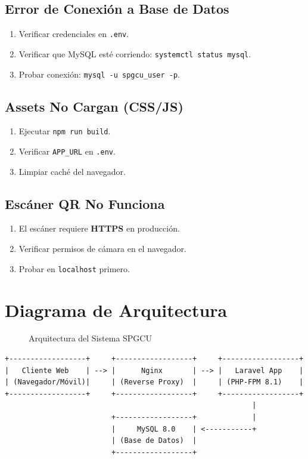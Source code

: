 \documentclass[12pt,a4paper]{article}
\begin{document}
\subsection{Error de Conexión a Base de Datos}
\begin{enumerate}
    \item Verificar credenciales en \texttt{.env}.
    \item Verificar que MySQL esté corriendo: \texttt{systemctl status mysql}.
    \item Probar conexión: \texttt{mysql -u spgcu\_user -p}.
\end{enumerate}

\subsection{Assets No Cargan (CSS/JS)}
\begin{enumerate}
    \item Ejecutar \texttt{npm run build}.
    \item Verificar \texttt{APP\_URL} en \texttt{.env}.
    \item Limpiar caché del navegador.
\end{enumerate}

\subsection{Escáner QR No Funciona}
\begin{enumerate}
    \item El escáner requiere \textbf{HTTPS} en producción.
    \item Verificar permisos de cámara en el navegador.
    \item Probar en \texttt{localhost} primero.
\end{enumerate}

\section{Diagrama de Arquitectura}

\begin{figure}[h]
    \centering
    \caption{Arquitectura del Sistema SPGCU}
    \label{fig:arquitectura}
\end{figure}

\begin{verbatim}
+------------------+     +------------------+     +------------------+
|   Cliente Web    | --> |      Nginx       | --> |   Laravel App    |
| (Navegador/Móvil)|     | (Reverse Proxy)  |     | (PHP-FPM 8.1)    |
+------------------+     +------------------+     +------------------+
                                                          |
                         +------------------+             |
                         |     MySQL 8.0    | <-----------+
                         | (Base de Datos)  |
                         +------------------+
\end{verbatim}
\end{document}
